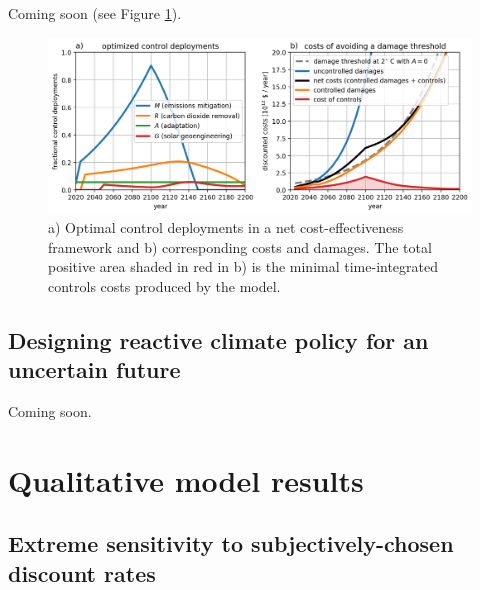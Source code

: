 \documentclass{article}
\begin{document}
Coming soon (see Figure \ref{fig.approach2}).


\begin{figure}[htb!]
\noindent\includegraphics[width=1.0\textwidth]{figures/default-temp_controls_and_damages.png}
\centering
\caption{a) Optimal control deployments in a net cost-effectiveness framework and b) corresponding costs and damages. The total positive area shaded in red in b) is the minimal time-integrated controls costs produced by the model.}
\label{fig.approach2}
\end{figure}

\subsection{Designing reactive climate policy for an uncertain future}\label{sec.reactive}

Coming soon.

\section{Qualitative model results}

\subsection{Extreme sensitivity to subjectively-chosen discount rates}


\end{document}
